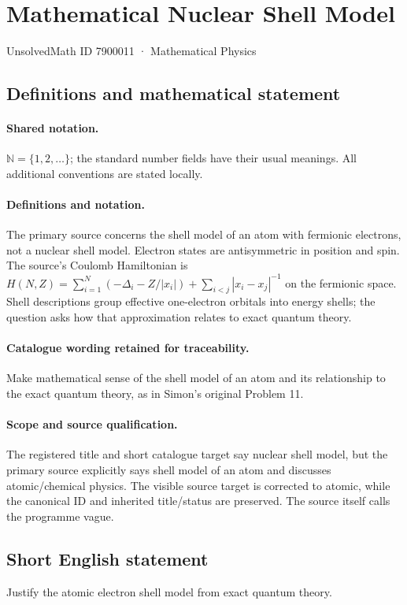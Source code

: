 \documentclass[11pt]{article}
\begin{document}
\setcounter{section}{7900010}
\section{Mathematical Nuclear Shell Model}\label{7900011}
{\small UnsolvedMath ID 7900011 · Mathematical Physics}
\subsection{Definitions and mathematical statement}

\paragraph{Shared notation.}$\mathbb N=\{1,2,\ldots\}$; the standard number fields have their usual meanings. All additional conventions are stated locally.


\paragraph{Definitions and notation.}The primary source concerns the shell model of an atom with fermionic electrons, not a nuclear shell model. Electron states are antisymmetric in position and spin. The source's Coulomb Hamiltonian is $H(N,Z)=\sum_{i=1}^N(-\Delta_i-Z/|x_i|)+\sum_{i<j}|x_i-x_j|^{-1}$ on the fermionic space. Shell descriptions group effective one-electron orbitals into energy shells; the question asks how that approximation relates to exact quantum theory.

\paragraph{Catalogue wording retained for traceability.}
Make mathematical sense of the shell model of an atom and its relationship to the exact quantum theory, as in Simon’s original Problem 11.
\paragraph{Scope and source qualification.}The registered title and short catalogue target say nuclear shell model, but the primary source explicitly says shell model of an atom and discusses atomic/chemical physics. The visible source target is corrected to atomic, while the canonical ID and inherited title/status are preserved. The source itself calls the programme vague.
\subsection{Short English statement}
Justify the atomic electron shell model from exact quantum theory.
\end{document}
